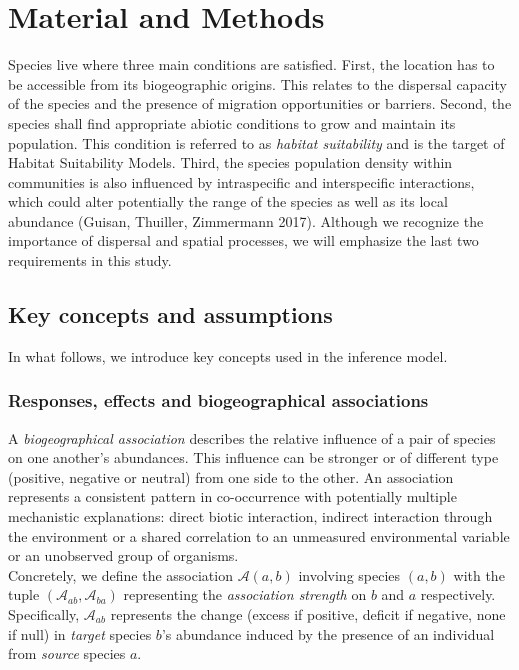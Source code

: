 \documentclass[]{article}
\begin{document}
\section{Material and Methods}
Species live where three main conditions are satisfied. First, the location has to be accessible from its biogeographic origins. This relates to the dispersal capacity of the species and the presence of migration opportunities or barriers.  Second, the species shall find appropriate abiotic conditions to grow and maintain its population. This condition is referred to as \textit{habitat suitability} and is the target of Habitat Suitability Models. Third, the species population density within communities is also influenced by intraspecific and interspecific interactions, which could alter potentially the range of the species as well as its local abundance (Guisan, Thuiller, Zimmermann 2017). Although we recognize the importance of dispersal and spatial processes, we will emphasize the last two requirements in this study. 


\subsection{Key concepts and assumptions}
\noindent In what follows, we introduce key concepts used in the inference model. 

\subsubsection{Responses, effects and biogeographical associations}
A \textit{biogeographical association} describes the relative influence of a pair of species on one another's abundances. This influence can be stronger or of different type (positive, negative or neutral) from one side to the other. An association represents a consistent pattern in co-occurrence with potentially multiple mechanistic explanations: direct biotic interaction, indirect interaction through the environment or a shared correlation to an unmeasured environmental variable or an unobserved group of organisms.  \\

\noindent Concretely, we define the association $\mathcal{A}(a,b)$ involving species $(a,b)$ with the tuple $(\mathcal{A}_{ab},\mathcal{A}_{ba})$ representing the \textit{association strength} on $b$ and $a$ respectively. Specifically, $\mathcal{A}_{ab}$ represents the change (excess if positive, deficit if negative, none if null) in \textit{target }species $b$'s abundance induced by the presence of an individual from \textit{source} species $a$. \\
\end{document}
